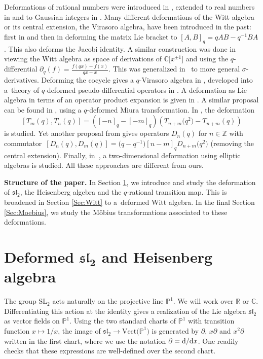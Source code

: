 \documentclass[10pt,a4paper]{amsart}
\numberwithin{equation}{section}
\newcommand*{\R}{\mathbb{R}}
\newcommand*{\C}{\mathbb{C}}
\newcommand*{\Z}{\mathbb{Z}}
\begin{document}
Deformations of rational numbers were introduced in \cite{morier2020continued}, extended to real numbers in \cite{morier2022q} and to Gaussian integers in \cite{ovsienko2021towards}. Many different deformations of the Witt algebra or its central extension, the Virasoro algebra, have been introduced in the past: first in \cite{curtright1990deforming} and then in \cite{chaichian1991q} deforming the matrix Lie bracket to $[A,B]_q=qAB-q^{-1}BA$. This also deforms the Jacobi identity. A similar construction was done in \cite{hu2005q} viewing the Witt algebra as space of derivations of $\C\big[x^{\pm 1}\big]$ and using the $q$-differential $\partial_q(f)=\tfrac{f(qx)-f(x)}{qx-x}$. This was generalized in~\cite{hartwig2006deformations} to more general $\sigma$-derivatives. Deforming the cocycle gives a $q$-Virasoro algebra in \cite{kassel1992cyclic}, developed into a~theory of $q$-deformed pseudo-differential operators in \cite{khesin1997extensions}. A deformation as Lie algebra in terms of an operator product expansion is given in \cite{shiraishi1996quantum}. A similar proposal can be found in \cite[equation (1.3)]{frenkel1996quantum}, using a $q$-deformed Miura transformation. In \cite[equation~(38)]{nedelin2017q}, the deformation
\[
[T_m(q),T_n(q)]=([-n]_q-[-m]_q)(T_{n+m}\big(q^2\big)-T_{n+m}(q))\]
 is studied. Yet another proposal from \cite[formula~(3.18)]{nigro2016q} gives operators $D_n(q)$ for $n\in\Z$ with commutator~${[D_n(q),D_m(q)]=\big(q-q^{-1}\big)[n-m]_qD_{n+m}\big(q^2\big)}$ (removing the central extension). Finally, in~\cite{avan2017deformed}, a two-dimensional deformation using elliptic algebras is studied. All these approaches are different from ours.

\textbf{Structure of the paper.} In Section \ref{Sec:sl2}, we introduce and study the deformation of $\mathfrak{sl}_2$, the Heisenberg algebra and the $q$-rational transition map. This is broadened in Section \ref{Sec:Witt} to a~deformed Witt algebra. In the final Section \ref{Sec:Moebius}, we study the M\"obius transformations associated to these deformations.



\section[Deformed sl\_2 and Heisenberg algebra]{Deformed $\boldsymbol{\mathfrak{sl}_2}$ and Heisenberg algebra}\label{Sec:sl2}

The group $\mathrm{SL}_2$ acts naturally on the projective line $\mathbb{P}^1$. We will work over $\R$ or $\C$. Differentiating this action at the identity gives a realization of the Lie algebra $\mathfrak{sl}_2$ as vector fields on $\mathbb{P}^1$.
Using the two standard charts of $\mathbb{P}^1$ with transition function $x\mapsto 1/x$, the image of $\mathfrak{sl}_2\to \mathrm{Vect}\big(\mathbb{P}^1\big)$ is generated by $\partial$, $x\partial$ and $x^2\partial$ written in the first chart, where we use the notation $\partial={\rm d}/{\rm d}x$. One readily checks that these expressions are well-defined over the second chart.
\end{document}
